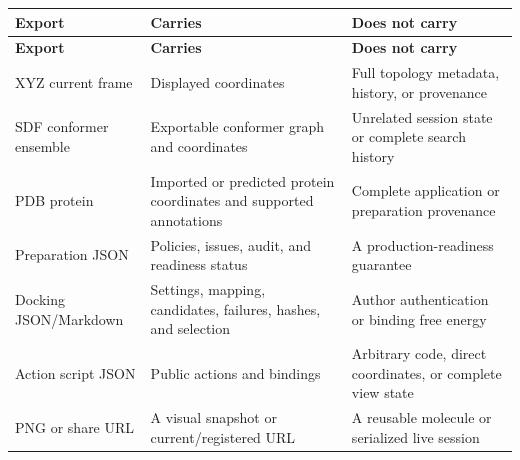 
\begingroup
\footnotesize
\begin{longtable}{@{}p{1.20in}p{2.48in}p{2.92in}@{}}
\toprule
\textbf{Export} & \textbf{Carries} & \textbf{Does not carry}\\
\midrule
\endfirsthead
\toprule
\textbf{Export} & \textbf{Carries} & \textbf{Does not carry}\\
\midrule
\endhead
XYZ current frame & Displayed coordinates & Full topology metadata, history, or provenance\\
SDF conformer ensemble & Exportable conformer graph and coordinates & Unrelated session state or complete search history\\
PDB protein & Imported or predicted protein coordinates and supported annotations & Complete application or preparation provenance\\
Preparation JSON & Policies, issues, audit, and readiness status & A production-readiness guarantee\\
Docking JSON/Markdown & Settings, mapping, candidates, failures, hashes, and selection & Author authentication or binding free energy\\
Action script JSON & Public actions and bindings & Arbitrary code, direct coordinates, or complete view state\\
PNG or share URL & A visual snapshot or current/registered URL & A reusable molecule or serialized live session\\
\bottomrule
\end{longtable}
\endgroup


